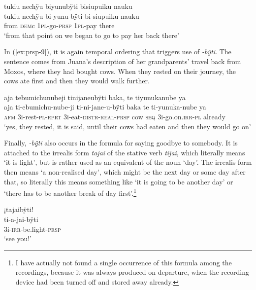 \ea\label{ex:INCH-1}
\begingl 
\glpreamble tukiu nechÿu biyunubÿti bisiupuiku nauku\\
\gla tukiu nechÿu bi-yunu-bÿti bi-siupuiku nauku\\ 
\glb from \textsc{dem}c 1\textsc{pl}-go-\textsc{prsp} 1\textsc{pl}-pay there \\ 
\glft ‘from that point on we began to go to pay her back there’\\ 
\endgl
\trailingcitation{[jxx-p120515l-2.084]}
\xe

In (\ref{ex:prsp-9}), it is again temporal ordering that triggers use of \textit{-bÿti}. The sentence comes from Juana’s description of her grandparents’ travel back from Moxos, where they had bought cows. When they rested on their journey, the cows ate first and then they would walk further.

\ea\label{ex:prsp-9}
\begingl
\glpreamble aja tebumichunubeji tinijaneubÿti baka, te tiyunukanube ya\\
\gla aja ti-ebumichu-nube-ji ti-ni-jane-u-bÿti baka te ti-yunuka-nube ya\\
\glb \textsc{afm} 3i-rest-\textsc{pl}-\textsc{rprt} 3i-eat-\textsc{distr}-\textsc{real}-\textsc{prsp} cow \textsc{seq} 3i-go.on.\textsc{irr}-\textsc{pl} already\\
\glft ‘yes, they rested, it is said, until their cows had eaten and then they would go on’
\endgl
\trailingcitation{[jxx-p151016l-2.043-045]}
\xe


Finally, \textit{-bÿti} also occurs in the formula for saying goodbye to somebody. It is attached to the irrealis form \textit{tajai} of the stative verb \textit{tijai}, which literally means ‘it is light’, but is rather used as an equivalent of the noun ‘day’. The irrealis form then means ‘a non-realised day’, which might be the next day or some day after that, so literally this means something like ‘it is going to be another day’ or ‘there has to be another break of day first’.\footnote{I have actually not found a single occurrence of this formula among the recordings, because it was always produced on departure, when the recording device had been turned off and stored away already.}

\ea\label{ex:prsp-10}
\begingl
\glpreamble ¡tajaibÿti!\\
\gla ti-a-jai-bÿti\\
\glb 3i-\textsc{irr}-be.light-\textsc{prsp}\\
\glft ‘see you!’
\endgl
\xe
{}

